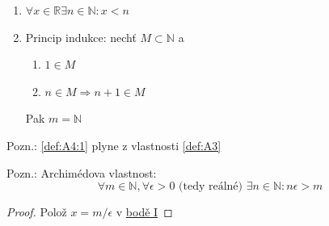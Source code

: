 \begin{definitionAi}[name=Vlastnosti \texorpdfstring{$\mathbb{N}$}{N}, label=def:A4]\noindent
	\begin{enumerate}[I]
		\item\label{def:A4:1} $\forall x\in\mathbb{R}\exists n\in\mathbb{N}: x<n$
		\item Princip indukce: nechť $M\subset\mathbb{N}$ a
			\begin{enumerate}
				\item $1\in M$
				\item $n\in M \Rightarrow n+1\in M$
			\end{enumerate}
			Pak $m=\mathbb{N}$
	\end{enumerate}
\end{definitionAi}

Pozn.: \autoref{def:A4:1} plyne z vlastnosti \autoref{def:A3}

Pozn.: Archimédova vlastnost:
\begin{equation}
	\forall m\in\mathbb{N}, \forall \epsilon>0 \text{ (tedy reálné) }\exists n\in\mathbb{N}:n\epsilon>m
\end{equation}
\begin{proof}
	Polož $x=m/\epsilon$ v \hyperref[def:A4:1]{bodě I}
\end{proof}

